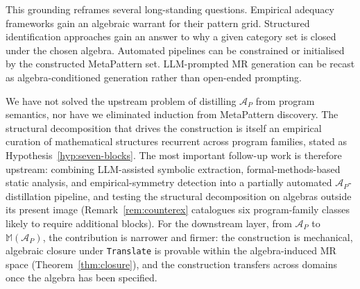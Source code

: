 \documentclass[manuscript]{acmart}
\begin{document}
This grounding reframes several long-standing questions. Empirical adequacy frameworks gain an algebraic warrant for their pattern grid. Structured identification approaches gain an answer to why a given category set is closed under the chosen algebra. Automated pipelines can be constrained or initialised by the constructed MetaPattern set. LLM-prompted MR generation can be recast as algebra-conditioned generation rather than open-ended prompting.

We have not solved the upstream problem of distilling $\mathcal{A}_P$ from program semantics, nor have we eliminated induction from MetaPattern discovery. The structural decomposition that drives the construction is itself an empirical curation of mathematical structures recurrent across program families, stated as Hypothesis~\ref{hyp:seven-blocks}. The most important follow-up work is therefore upstream: combining LLM-assisted symbolic extraction, formal-methods-based static analysis, and empirical-symmetry detection into a partially automated $\mathcal{A}_P$-distillation pipeline, and testing the structural decomposition on algebras outside its present image (Remark~\ref{rem:counterex} catalogues six program-family classes likely to require additional blocks). For the downstream layer, from $\mathcal{A}_P$ to $\mathbb{M}(\mathcal{A}_P)$, the contribution is narrower and firmer: the construction is mechanical, algebraic closure under \texttt{Translate} is provable within the algebra-induced MR space (Theorem~\ref{thm:closure}), and the construction transfers across domains once the algebra has been specified.
\end{document}
